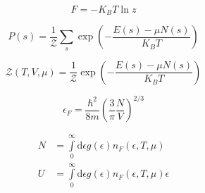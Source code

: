 \begin{equation*}
    F = - K_{B} T \ln z
\end{equation*}

\begin{equation*}
    P(s) = \frac{1}{\mathcal{Z}} \sum_{s} \exp \left(- \frac{E(s) - \mu N(s)}{K_{B}T} \right)
\end{equation*}

\begin{equation*}
    \mathcal{Z}(T,V,\mu) = \frac{1}{\mathcal{Z}} \exp \left(- \frac{E(s) - \mu N(s)}{K_{B}T} \right)
\end{equation*}

\begin{equation*}
    \epsilon_{F} = \frac{\hbar^{2}}{8m} \left(  \frac{3}{\pi} \frac{N}{V} \right)^{2/3}
\end{equation*}

\begin{align*}
    N &= \int\limits^{\infty}_{0} \mathrm{d}\epsilon g(\epsilon)n_{F}(\epsilon,T,\mu) \\
    U &= \int\limits^{\infty}_{0} \mathrm{d}\epsilon g(\epsilon)n_{F}(\epsilon,T,\mu) \epsilon
\end{align*}
